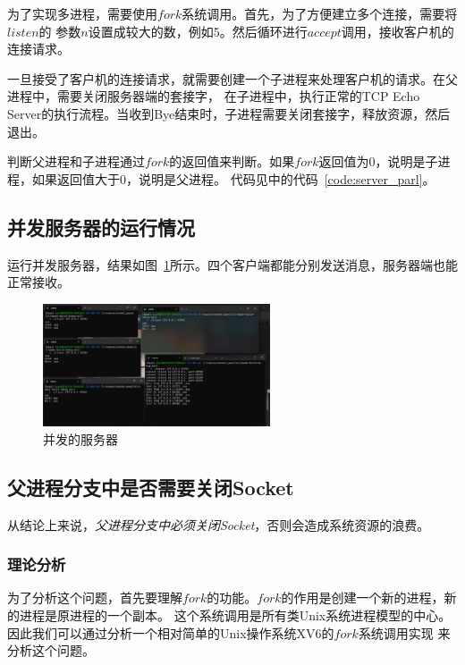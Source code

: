 \documentclass[a4paper,twoside]{article}
\begin{document}
\begin{spacing}{1.2}
为了实现多进程，需要使用$fork$系统调用。首先，为了方便建立多个连接，需要将$listen$的
参数$n$设置成较大的数，例如5。然后循环进行$accept$调用，接收客户机的连接请求。

一旦接受了客户机的连接请求，就需要创建一个子进程来处理客户机的请求。在父进程中，需要关闭服务器端的套接字，
在子进程中，执行正常的TCP Echo Server的执行流程。当收到Bye结束时，子进程需要关闭套接字，释放资源，然后退出。

判断父进程和子进程通过$fork$的返回值来判断。如果$fork$返回值为0，说明是子进程，如果返回值大于0，说明是父进程。
代码见中的代码~\ref{code:server_parl}。

\subsection{并发服务器的运行情况}

运行并发服务器，结果如图~\ref{fig:parl}所示。四个客户端都能分别发送消息，服务器端也能正常接收。

\begin{figure}[htb]
	\centering
	\caption{并发的服务器}
	\label{fig:parl}
	\includegraphics[width=0.6\textwidth]{para.png}
\end{figure}

\subsection{父进程分支中是否需要关闭Socket}

从结论上来说，\emph{父进程分支中必须关闭Socket}，否则会造成系统资源的浪费。

\subsubsection{理论分析}

为了分析这个问题，首先要理解$fork$的功能。$fork$的作用是创建一个新的进程，新的进程是原进程的一个副本。
这个系统调用是所有类Unix系统进程模型的中心。因此我们可以通过分析一个相对简单的Unix操作系统XV6的$fork$系统调用实现
来分析这个问题。


\end{spacing}
\end{document}
